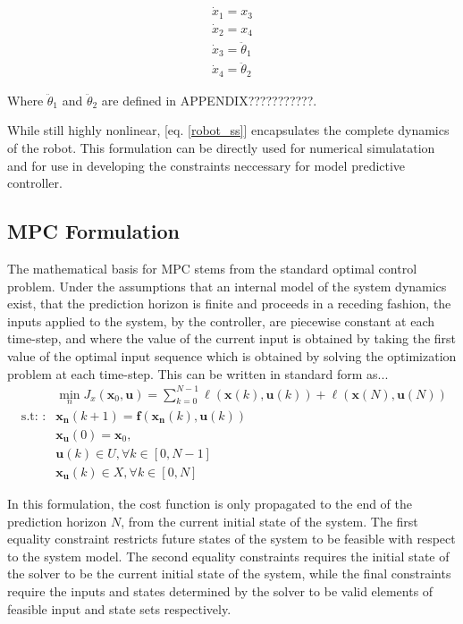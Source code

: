 \documentclass[journal]{IEEEtran}
\begin{document}
\begin{equation}\label{robot_ss}
\begin{array}{l}
\dot{x}_{1}=x_{3} \\
\dot{x}_{2}=x_{4} \\
\dot{x}_{3}=\ddot{\theta}_{1} \\
\dot{x}_{4}=\ddot{\theta}_{2}
\end{array}
\end{equation}

Where $ \ddot{\theta}_{1}$ and $\ddot{\theta}_{2}$ are defined in APPENDIX???????????.

While still highly nonlinear, [eq. \ref{robot_ss}] encapsulates the complete dynamics of the robot. This formulation can be directly used for numerical simulatation and for use in developing the constraints neccessary for model predictive controller.


\subsection{MPC Formulation}
The mathematical basis for MPC stems from the standard optimal control problem. Under the assumptions that an internal model of the system dynamics exist, that the prediction horizon is finite and proceeds in a receding fashion, the inputs applied to the system, by the controller, are piecewise constant at each time-step, and where the value of the current input is obtained by taking the first value of the optimal input sequence which is obtained by solving the optimization problem at each time-step. This can be written in standard form as...
\begin{equation}
\begin{aligned}
& \min _{n} J_{x}\left(\mathbf{x}_{0}, \mathbf{u}\right)=\sum_{k=0}^{N-1} \ell\left(\mathbf{x}(k), \mathbf{u}(k)\right) + \ell\left(\mathbf{x}(N), \mathbf{u}(N)\right)\\
\text { s.t: }: & \mathbf{x}_{\mathbf{n}}(k+1)=\mathbf{f}\left(\mathbf{x}_{\mathbf{n}}(k), \mathbf{u}(k)\right) \\
& \mathbf{x}_{\mathbf{u}}(0)=\mathbf{x}_{0}, \\
& \mathbf{u}(k) \in U, \forall k \in[0, N-1] \\
& \mathbf{x}_{\mathbf{u}}(k) \in X, \forall k \in[0, N]
\end{aligned}
\end{equation}

In this formulation, the cost function is only propagated to the end of the prediction horizon $N$, from the current initial state of the system. The first equality constraint restricts future states of the system to be feasible with respect to the system model. The second equality constraints requires the initial state of the solver to be the current initial state of the system, while the final constraints require the inputs and states determined by the solver to be valid elements of feasible input and state sets respectively. \\
\end{document}
